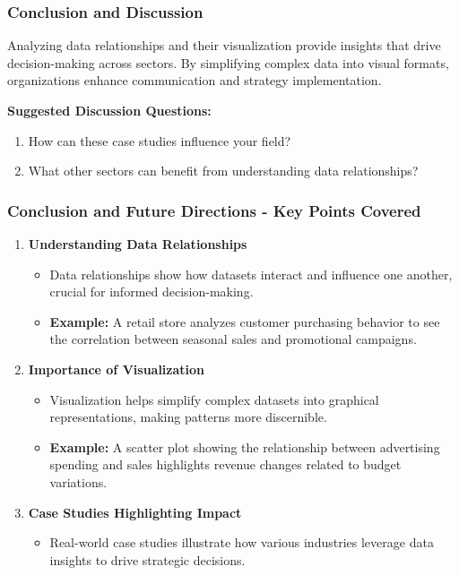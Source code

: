 \documentclass[aspectratio=169]{beamer}
\begin{document}
\begin{frame}[fragile]
    \frametitle{Conclusion and Discussion}
    Analyzing data relationships and their visualization provide insights that drive decision-making across sectors. By simplifying complex data into visual formats, organizations enhance communication and strategy implementation.

    \textbf{Suggested Discussion Questions:}
    \begin{enumerate}
        \item How can these case studies influence your field?
        \item What other sectors can benefit from understanding data relationships?
    \end{enumerate}
\end{frame}

\begin{frame}[fragile]
    \frametitle{Conclusion and Future Directions - Key Points Covered}
    
    \begin{enumerate}
        \item \textbf{Understanding Data Relationships}  
            \begin{itemize}
                \item Data relationships show how datasets interact and influence one another, crucial for informed decision-making.
                \item \textbf{Example:} A retail store analyzes customer purchasing behavior to see the correlation between seasonal sales and promotional campaigns.
            \end{itemize}
        
        \item \textbf{Importance of Visualization}  
            \begin{itemize}
                \item Visualization helps simplify complex datasets into graphical representations, making patterns more discernible.
                \item \textbf{Example:} A scatter plot showing the relationship between advertising spending and sales highlights revenue changes related to budget variations.
            \end{itemize}
        
        \item \textbf{Case Studies Highlighting Impact}  
            \begin{itemize}
                \item Real-world case studies illustrate how various industries leverage data insights to drive strategic decisions.
            \end{itemize}
        

\end{enumerate}
\end{frame}
\end{document}
